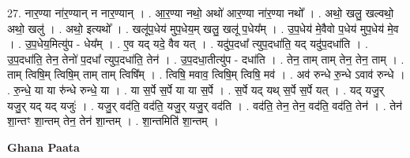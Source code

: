 \documentclass[17pt]{extarticle}
\begin{document}
27. नार॒ण्या ना॑र॒ण्यान् न नार॒ण्यान् । . आ॒र॒ण्या नथो॒ अथो॑ आर॒ण्या ना॑र॒ण्या नथो᳚ । . अथो॒ खलु॒ खल्वथो॒ अथो॒ खलु॑ । . अथो॒ इत्यथो᳚ । . खलू॑प॒धेय॑ मुप॒धेय॒म् खलु॒ खलू॑ प॒धेय᳚म् । . उ॒प॒धेय॑ मे॒वैवो प॒धेय॑ मुप॒धेय॑ मे॒व । . उ॒प॒धेय॒मित्यु॑प - धेय᳚म् । . ए॒व यद् यदे॒ वैव यत् । . यदु॑प॒दधा᳚ त्युप॒दधा॑ति॒ यद् यदु॑प॒दधा॑ति । . उ॒प॒दधा॑ति॒ तेन॒ तेनो॑ प॒दधा᳚ त्युप॒दधा॑ति॒ तेन॑ । . उ॒प॒दधा॒तीत्यु॑प - दधा॑ति । . तेन॒ ताम् ताम् तेन॒ तेन॒ ताम् । . ताम् त्विषि॒म् त्विषि॒म् ताम् ताम् त्विषि᳚म् । . त्विषि॒ मवाव॒ त्विषि॒म् त्विषि॒ मव॑ । . अव॑ रुन्धे रु॒न्धे ऽवाव॑ रुन्धे । . रु॒न्धे॒ या या रु॑न्धे रुन्धे॒ या । . या स॒र्पे स॒र्पे या या स॒र्पे । . स॒र्पे यद् यथ् स॒र्पे स॒र्पे यत् । . यद् यजु॒र् यजु॒र् यद् यद् यजुः॑ । . यजु॒र् वद॑ति॒ वद॑ति॒ यजु॒र् यजु॒र् वद॑ति । . वद॑ति॒ तेन॒ तेन॒ वद॑ति॒ वद॑ति॒ तेन॑ । . तेन॑ शा॒न्तꣳ शा॒न्तम् तेन॒ तेन॑ शा॒न्तम् । . शा॒न्तमिति॑ शा॒न्तम् । \newline

\textbf{Ghana Paata } \newline
\end{document}
